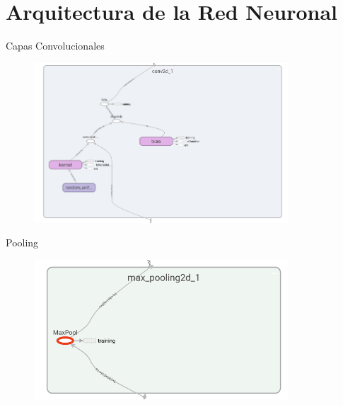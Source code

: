 \documentclass[10pt]{beamer}
\begin{document}
\section*{Arquitectura de la Red Neuronal}

\begin{frame}{Capas Convolucionales}
    \begin{figure}[!ht] 
        \centering
        \includegraphics[width=0.85\textwidth]{../img/convlayer}
    \end{figure}
\end{frame}

\begin{frame}{Pooling}
    \begin{figure}[!ht] 
        \centering
        \includegraphics[width=0.85\textwidth]{../img/maxpooltf}
    \end{figure}
\end{frame}
\end{document}
